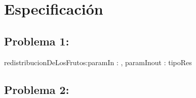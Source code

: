 \documentclass[10pt,a4paper]{article}
\begin{document}
\maketitle

\section{Especificación}

\subsection{Problema 1:}

\begin{proc}{redistribucionDeLosFrutos:}{\In paramIn : \nat, \Inout paramInout : \TLista{\ent}}{tipoRes}
\end{proc}

\subsection{Problema 2:}
\end{document}
